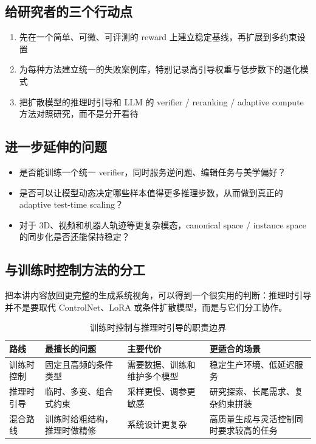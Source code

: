 \subsection{给研究者的三个行动点}

\begin{enumerate}
    \item 先在一个简单、可微、可评测的 reward 上建立稳定基线，再扩展到多约束设置
    \item 为每种方法建立统一的失败案例库，特别记录高引导权重与低步数下的退化模式
    \item 把扩散模型的推理时引导和 LLM 的 verifier / reranking / adaptive compute 方法对照研究，而不是分开看待
\end{enumerate}

\subsection{进一步延伸的问题}

\begin{itemize}
    \item 是否能训练一个统一 verifier，同时服务逆问题、编辑任务与美学偏好？
    \item 是否可以让模型动态决定哪些样本值得更多推理步数，从而做到真正的 adaptive test-time scaling？
    \item 对于 3D、视频和机器人轨迹等更复杂模态，canonical space / instance space 的同步化是否还能保持稳定？
\end{itemize}

\subsection{与训练时控制方法的分工}

把本讲内容放回更完整的生成系统视角，可以得到一个很实用的判断：推理时引导并不是要取代 ControlNet、LoRA 或条件扩散模型，而是与它们分工协作。

\begin{table}[H]
\centering
\begin{tabular}{p{} p{} p{} p{}}
\toprule
路线 & 最擅长的问题 & 主要代价 & 更适合的场景 \\
\midrule
训练时控制 & 固定且高频的条件类型 & 需要数据、训练和维护多个模型 & 稳定生产环境、低延迟服务 \\
推理时引导 & 临时、多变、组合式约束 & 采样更慢、调参更敏感 & 研究探索、长尾需求、复杂约束拼装 \\
混合路线 & 训练时给粗结构，推理时做精修 & 系统设计更复杂 & 高质量生成与灵活控制同时要求较高的任务 \\
\bottomrule
\end{tabular}
\caption{训练时控制与推理时引导的职责边界}
\end{table}

